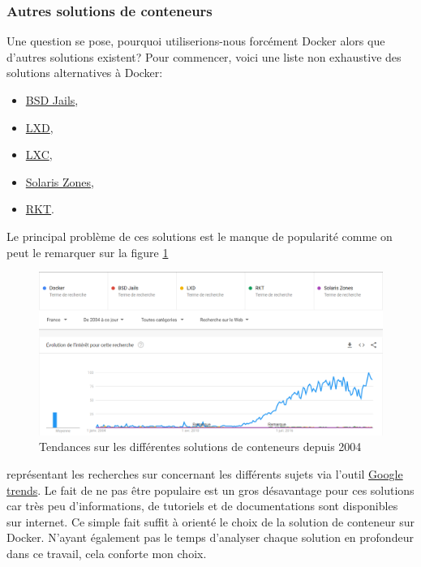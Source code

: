 \documentclass[
    iai, %
    il, %
]{heig-tb}
\begin{document}
\subsubsection{Autres solutions de conteneurs}
Une question se pose, pourquoi utiliserions-nous forcément Docker alors que d'autres solutions existent?
Pour commencer, voici une liste non exhaustive des solutions alternatives à Docker:
\begin{itemize}
    \item \href{https://fr.wikipedia.org/wiki/BSD_Jail}{BSD Jails},
    \item \href{https://linuxcontainers.org/lxd/}{LXD},
    \item \href{https://linuxcontainers.org/lxc/introduction/}{LXC},
    \item \href{https://docs.oracle.com/cd/E18440_01/doc.111/e18415/chapter_zones.htm#OPCUG426}{Solaris Zones},
    \item \href{https://www.redhat.com/en/topics/containers/what-is-rkt}{RKT}.
\end{itemize}

Le principal problème de ces solutions est le manque de popularité comme on peut le remarquer sur la figure \ref{containers-trends}

\begin{center}
    \begin{figure}
        \includegraphics[width=\textwidth]{./assets/figures/google-trend-containers-2022.png}
        \caption[Tendances solutions de conteneurs]{Tendances sur les différentes solutions de conteneurs depuis 2004} \label{containers-trends}
    \end{figure}
\end{center}


représentant les recherches sur concernant les différents sujets via l'outil \href{https://trends.google.fr/trends}{Google trends}.\newline
Le fait de ne pas être populaire est un gros désavantage pour ces solutions car très peu d'informations, de tutoriels et de documentations sont disponibles sur internet.\newline
Ce simple fait suffit à orienté le choix de la solution de conteneur sur Docker.\newline
N'ayant également pas le temps d'analyser chaque solution en profondeur dans ce travail, cela conforte mon choix.
\end{document}
